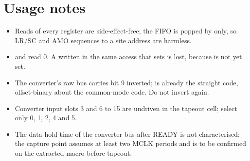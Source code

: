 \section{Usage notes}

\begin{itemize}
	\item Reads of every register are side-effect-free; the FIFO is popped by  only, so LR/SC and AMO sequences to a site address are harmless.
	\item {} and  read 0. A  written in the same access that sets  is lost, because  is not yet set.
	\item The converter's raw bus carries bit 9 inverted;  is already the straight code, offset-binary about the common-mode code. Do not invert again.
	\item Converter input slots 3 and 6 to 15 are undriven in the tapeout cell; select only 0, 1, 2, 4 and 5.
	\item The data hold time of the converter bus after READY is not characterised; the capture point assumes at least two MCLK periods and is to be confirmed on the extracted macro before tapeout.
\end{itemize}
